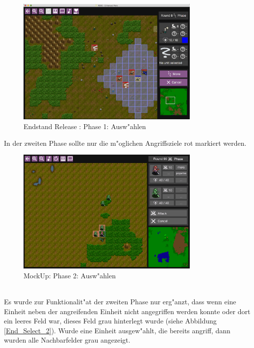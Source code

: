 \documentclass[12pt, titlepage]{scrartcl}
\newcommand{\RN}[1]{%
	\textup{\uppercase\expandafter{\romannumeral#1}}%
}
\newcounter{subsubsubsection}[subsubsection]
\begin{document}
					\begin{figure}[H] 
						\centering
						\includegraphics[width=0.8\textwidth]{images/endOfRelease/Select.png}
						\caption{Endstand Release \RN{3}: Phase 1: Ausw"ahlen}
						\label{End_Select_1}
					\end{figure}
					In der zweiten Phase sollte nur die m"oglichen Angriffsziele rot markiert werden.
					\begin{figure}[H] 
						\centering
						\includegraphics[width=0.8\textwidth]{images/mockUps/Select3.png}
						\caption{MockUp: Phase 2: Ausw"ahlen}
						\label{Select_2_2}
					\end{figure}
					\ \\ Es wurde zur Funktionalit"at der zweiten Phase nur erg"anzt, dass wenn eine Einheit neben der angreifenden Einheit nicht angegriffen werden konnte oder dort ein leeres Feld war, dieses Feld grau hinterlegt wurde (siehe Abbildung \ref{End_Select_2}). Wurde eine Einheit ausgew"ahlt, die bereits angriff, dann wurden alle Nachbarfelder grau angezeigt.
\end{document}
